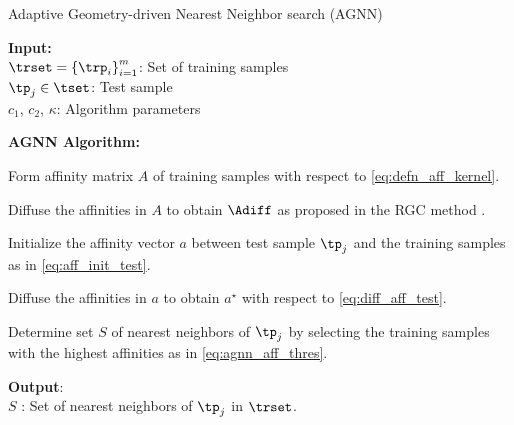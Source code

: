 \documentclass[journal]{IEEEtran}
\begin{document}
\begin{algorithm}[t]
\scriptsize
\caption{Adaptive Geometry-driven Nearest Neighbor search (AGNN)}

\begin{algorithmic}[1]

\STATE
\textbf{Input:} \\
$\trset = \left\{\trp_i  \right\}_{i=1}^{m} $: Set of training samples\\
$\tp_j \in \tset $: Test sample \\
$c_1$, $c_2$, $\kappa$: Algorithm parameters

\STATE
\textbf{AGNN Algorithm:}

\STATE
Form affinity matrix $A$ of training samples with respect to \eqref{eq:defn_aff_kernel}.

\STATE
Diffuse the affinities in $A$ to obtain $\Adiff$ as proposed in the RGC method \cite{Donoser13replicator}.

\STATE
Initialize the affinity vector $a$ between test sample $\tp_j$ and the training samples as in \eqref{eq:aff_init_test}.

\STATE
Diffuse the affinities in $a$ to obtain $a^{\star}$ with respect to \eqref{eq:diff_aff_test}. 

\STATE
Determine set $S$  of nearest neighbors of $\tp_j$ by selecting the training samples with the highest affinities as in \eqref{eq:agnn_aff_thres}. 


\STATE
\textbf{Output}:\\
$S$ : Set of nearest neighbors of $\tp_j$ in $\trset$. \\


\end{algorithmic}
\label{alg:agnn}
\end{algorithm}
\end{document}
